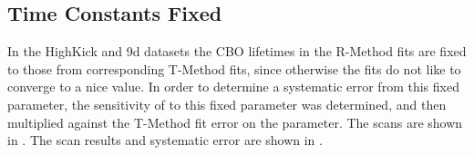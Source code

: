 \clearpage
\subsection{Time Constants Fixed}

In the HighKick and 9d datasets the CBO lifetimes in the R-Method fits are fixed to those from corresponding T-Method fits, since otherwise the fits do not like to converge to a nice value. In order to determine a systematic error from this fixed parameter, the sensitivity of \R to this fixed parameter was determined, and then multiplied against the T-Method fit error on the parameter. The scans are shown in . The scan results and systematic error are shown in .



